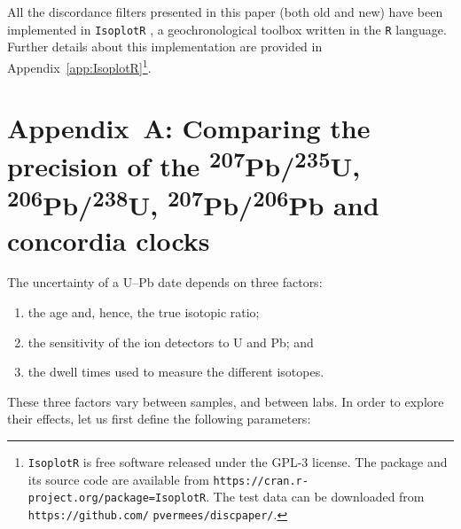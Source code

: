 \documentclass{article}
\begin{document}
All the discordance filters presented in this paper (both old and new)
have been implemented in \texttt{IsoplotR} \citep{vermeesch2018c}, a
geochronological toolbox written in the \texttt{R} language. Further
details about this implementation are provided in
Appendix~\ref{app:IsoplotR}\footnote{\texttt{IsoplotR} is free
  software released under the GPL-3 license. The package and its
  source code are available from
  \texttt{https://cran.r-project.org/package=IsoplotR}.  The test data
  can be downloaded from \texttt{https://github.com/}
  \texttt{pvermees/discpaper/}.}.

\section*{Appendix~A: Comparing the precision of the
  \textsuperscript{207}Pb/\textsuperscript{235}U,
  \textsuperscript{206}Pb/\textsuperscript{238}U,
  \textsuperscript{207}Pb/\textsuperscript{206}Pb and concordia
  clocks}\label{app:synthetics}

The uncertainty of a U--Pb date depends on three factors:

\begin{enumerate}
\item the age and, hence, the true isotopic ratio;
\item the sensitivity of the ion detectors to U and Pb; and
\item the dwell times used to measure the different isotopes.
\end{enumerate}

These three factors vary between samples, and between labs.  In order
to explore their effects, let us first define the following
parameters:
\end{document}
